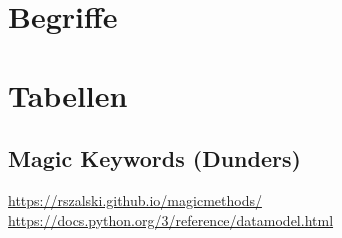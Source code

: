 \appendix
\begin{appendices}
\chapter{Begriffe}

\chapter{Tabellen}
\section{Magic Keywords (Dunders)}
\url{https://rszalski.github.io/magicmethods/}
\url{https://docs.python.org/3/reference/datamodel.html}

\end{appendices}
